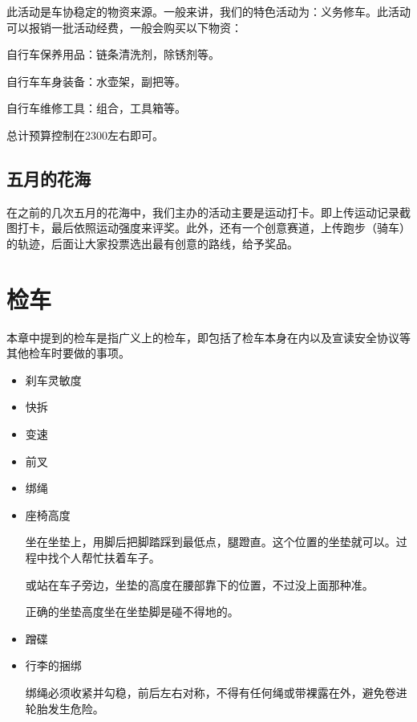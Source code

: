 \documentclass{ctexbook}
\begin{document}
此活动是车协稳定的物资来源。一般来讲，我们的特色活动为：义务修车。此活动可以报销一批活动经费，一般会购买以下物资：

自行车保养用品：链条清洗剂，除锈剂等。

自行车车身装备：水壶架，副把等。

自行车维修工具：组合，工具箱等。

总计预算控制在2300左右即可。
\subsection{五月的花海}
在之前的几次五月的花海中，我们主办的活动主要是运动打卡。即上传运动记录截图打卡，最后依照运动强度来评奖。此外，还有一个创意赛道，上传跑步（骑车）的轨迹，后面让大家投票选出最有创意的路线，给予奖品。

\section{检车}
本章中提到的检车是指广义上的检车，即包括了检车本身在内以及宣读安全协议等其他检车时要做的事项。
\begin{itemize}

\item 刹车灵敏度

\item 快拆

\item 变速

\item 前叉

\item 绑绳

\item 座椅高度

坐在坐垫上，用脚后把脚踏踩到最低点，腿蹬直。这个位置的坐垫就可以。过程中找个人帮忙扶着车子。

或站在车子旁边，坐垫的高度在腰部靠下的位置，不过没上面那种准。

正确的坐垫高度坐在坐垫脚是碰不得地的。

\item 蹭碟

\item 行李的捆绑

绑绳必须收紧并勾稳，前后左右对称，不得有任何绳或带裸露在外，避免卷进轮胎发生危险。
\end{itemize}
\end{document}

